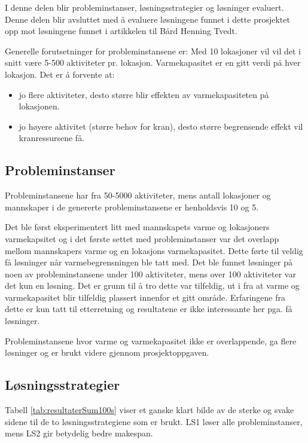 I denne delen blir probleminstanser, løsningsstrategier og løsninger evaluert. Denne delen blir avsluttet med å evaluere løsningene funnet i dette prosjektet opp mot løsningene funnet i artikkelen til Bård Henning Tvedt.

Generelle forutsetninger for probleminstansene er:
Med 10 lokasjoner vil vil det i snitt være 5-500 aktiviteter pr. lokasjon. Varmekapasitet er en gitt verdi på hver lokasjon. Det er å forvente at:
\begin{itemize}
\item jo flere aktiviteter, desto større blir effekten av varmekapasiteten på lokasjonen.
\item jo høyere aktivitet (større behov for kran), desto større begrensende effekt vil kranressursene få.
\end{itemize}

\subsection{Probleminstanser}
Probleminstansene har fra 50-5000 aktiviteter, mens antall lokasjoner og mannskaper i de genererte probleminstansene er henholdsvis 10 og 5.

Det ble først eksperimentert litt med mannskapets varme og lokasjoners varmekapsitet og i det første settet med probleminstanser var det overlapp mellom mannskapers varme og en lokasjons varmekapasitet. Dette førte til veldig få løsninger når varmebegrensningen ble tatt med. Det ble funnet løsninger på noen av probleminstansene under 100 aktiviteter, mens over 100 aktiviteter var det kun en løsning. Det er grunn til å tro dette var tilfeldig, ut i fra at varme og varmekapasitet blir tilfeldig plassert innenfor et gitt område. Erfaringene fra dette er kun tatt til etterretning og resultatene er ikke interessante her pga. få løsninger.

Probleminstansene hvor varme og varmekapasitet ikke er overlappende, ga flere løsninger og er brukt videre gjennom prosjektoppgaven.

\subsection{Løsningsstrategier}
Tabell \ref{tab:resultaterSum100s} viser et ganske klart bilde av de sterke og svake sidene til de to løsningsstrategiene som er brukt. LS1 løser alle probleminstanser, mens LS2 gir betydelig bedre makespan.

